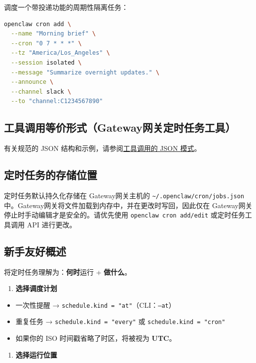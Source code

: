 调度一个带投递功能的周期性隔离任务：

\begin{lstlisting}[language=bash]
openclaw cron add \
  --name "Morning brief" \
  --cron "0 7 * * *" \
  --tz "America/Los_Angeles" \
  --session isolated \
  --message "Summarize overnight updates." \
  --announce \
  --channel slack \
  --to "channel:C1234567890"
\end{lstlisting}


\subsection{工具调用等价形式（Gateway网关定时任务工具）}


有关规范的 JSON 结构和示例，请参阅\href{/automation/cron-jobs\#json-schema-for-tool-calls}{工具调用的 JSON 模式}。

\subsection{定时任务的存储位置}


定时任务默认持久化存储在 Gateway网关主机的 \texttt{\textasciitilde{}/.openclaw/cron/jobs.json} 中。Gateway网关将文件加载到内存中，并在更改时写回，因此仅在 Gateway网关停止时手动编辑才是安全的。请优先使用 \texttt{openclaw cron add/edit} 或定时任务工具调用 API 进行更改。

\subsection{新手友好概述}


将定时任务理解为：\textbf{何时}运行 + \textbf{做什么}。

\begin{enumerate}
  \item \textbf{选择调度计划}
\end{enumerate}

\begin{itemize}
  \item 一次性提醒 → \texttt{schedule.kind = "at"}（CLI：\texttt{--at}）
  \item 重复任务 → \texttt{schedule.kind = "every"} 或 \texttt{schedule.kind = "cron"}
  \item 如果你的 ISO 时间戳省略了时区，将被视为 \textbf{UTC}。
\end{itemize}


\begin{enumerate}
  \item \textbf{选择运行位置}
\end{enumerate}

